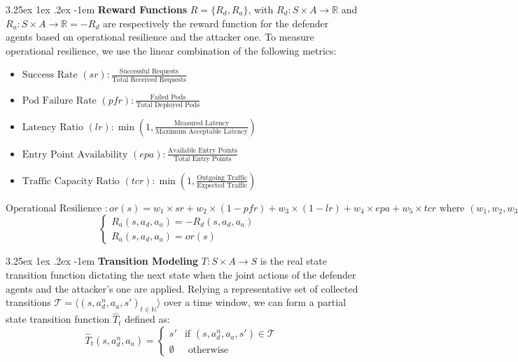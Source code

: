 \documentclass[conference]{IEEEtran}
\makeatletter
\renewcommand\paragraph{\@startsection{paragraph}{5}{\z@}%
  {3.25ex \@plus1ex \@minus.2ex}%
  {-1em}%
  {\normalfont\normalsize\bfseries}}
\makeatother
\begin{document}
\noindent \paragraph{\textbf{Reward Functions}} $R = \{R_d, R_a\}$, with $R_d: S \times A \to \mathbb{R}$ and $R_a: S \times A \to \mathbb{R} = - R_d$ are respectively the reward function for the defender agents based on operational resilience and the attacker one.
To measure operational resilience, we use the linear combination of the following metrics:
%
\begin{itemize}
    \item $\text{Success Rate } (sr) : \frac{\text{Successful Requests}}{\text{Total Received Requests}}$

    \item $\text{Pod Failure Rate } (pfr) : \frac{\text{Failed Pods}}{\text{Total Deployed Pods}}$
    
    \item $\text{Latency Ratio } (lr) : \min\left(1,\frac{\text{Measured Latency}}{\text{Maximum Acceptable Latency}}\right)$
    
    \item $\text{Entry Point Availability } (epa) : \frac{\text{Available Entry Points}}{\text{Total Entry Points}}$
    
    \item $\text{Traffic Capacity Ratio } (tcr) : \min\left(1, \frac{\text{Outgoing Traffic}}{\text{Expected Traffic}}\right)$
\end{itemize}
%
$\text{Operational Resilience }: or(s) = w_1 \times sr
\allowbreak + w_2 \times (1 - pfr)
\allowbreak + w_3 \times (1 - lr)
\allowbreak + w_4 \times epa
\allowbreak + w_5 \times tcr
\text{ where } (w_1, w_2, w_3, w_4, w_5) \text{ are relative weights.}$
$$
\begin{cases} 
    R_a(s, a_d, a_a) = -R_d(s, a_d, a_a) & \\
    R_a(s, a_d, a_a) = or(s)
\end{cases}
$$

\noindent \paragraph{\textbf{Transition Modeling}} $T: S \times A \rightarrow S$ is the real state transition function dictating the next state when the joint actions of the defender agents and the attacker's one are applied. Relying a representative set of collected transitions $\mathcal{T} = \langle(s, a_d^n, a_a, s')_{t\in \mathbb{N}}\rangle$ over a time window, we can form a partial state transition function $\hat{T}_t$ defined as:
%
$$
\hat{T}_t(s, a_d^n, a_a) =
\begin{cases} 
    s' & \text{if } (s, a_d^n, a_a, s') \in \mathcal{T} \\
    \emptyset & \text{ otherwise}
\end{cases}
$$
\end{document}
